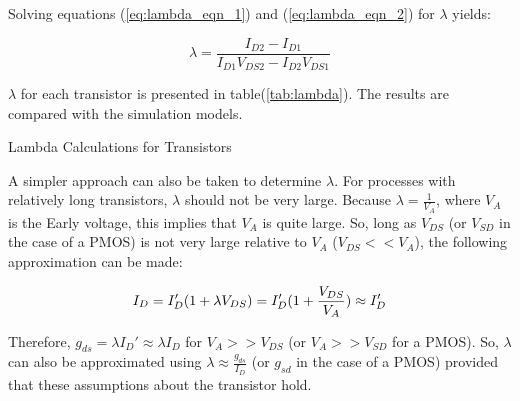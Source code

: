 Solving equations (\ref{eq:lambda_eqn_1}) and (\ref{eq:lambda_eqn_2}) for $\lambda$ yields:

\begin{equation}
	\label{eq:lambda_solved}
	\lambda = \frac{ I_{D2} - I_{D1} }{ I_{D1} V_{DS2} - I_{D2} V_{DS1} }
\end{equation}

$\lambda$ for each transistor is presented in table(\ref{tab:lambda}).
The results are compared with the simulation models.

\FloatBarrier

\begin{table}[h!]
	\centering
	\caption{Lambda Calculations for Transistors}
	\label{tab:lambda}
\end{table}

\FloatBarrier

A simpler approach can also be taken to determine $\lambda$.
For processes with relatively long transistors, $\lambda$ should not be very large.
Because $\lambda = \frac{1}{V_{A}}$, where $V_{A}$ is the Early voltage, this implies that $V_{A}$ is quite large.
So, long as $V_{DS}$ (or $V_{SD}$ in the case of a PMOS) is not very large relative to $V_{A}$ ($V_{DS} << V_{A}$), the following approximation can be made:

\begin{equation}
	\label{eq:approx_lambda}
	I_{D} = I_{D}' ( 1 + \lambda V_{DS} ) \\
	= I_{D}' ( 1 + \frac{V_{DS}}{V_{A}} ) \\
	\approx I_{D}'
\end{equation}

Therefore, $g_{ds} = \lambda I_{D}' \approx \lambda I_{D}$ for $V_{A} >> V_{DS}$ (or $V_{A} >> V_{SD}$ for a PMOS).
So, $\lambda$ can also be approximated using $\lambda \approx \frac{g_{ds}}{I_{D}}$ (or $g_{sd}$ in the case of a PMOS) provided that these assumptions about the transistor hold.

